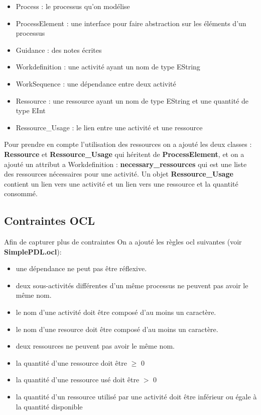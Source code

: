 \documentclass{article}
\begin{document}
\begin{itemize}
    \item Process : le processus qu'on modélise
    \item ProcessElement : une interface pour faire abstraction sur les éléments d'un processus
    \item Guidance : des notes écrites
    \item Workdefinition : une activité ayant un nom de type EString
    \item WorkSequence : une dépendance entre deux activité
    \item Ressource : une ressource ayant un nom de type EString et une quantité de type EInt
    \item Ressource\_Usage : le lien entre une activité et une ressource
\end{itemize}

Pour prendre en compte l'utilisation des ressources on a ajouté les deux classes : \textbf{Ressource} et \textbf{Ressource\_Usage}
qui héritent de \textbf{ProcessElement}, et on a ajouté un attribut a Workdefinition : \textbf{necessary\_ressources} qui est une liste 
des ressources nécessaires pour une activité. Un objet \textbf{Ressource\_Usage} contient un lien vers une activité et un lien vers 
une ressource et la quantité consommé.

\subsection{Contraintes OCL}
Afin de capturer plus de contraintes On a ajouté les règles ocl suivantes (voir \textbf{SimplePDL.ocl}):
\begin{itemize}
    \item une dépendance ne peut pas être réflexive.
    \item deux sous-activités différentes d’un même processus ne peuvent pas avoir le même nom.
    \item le nom d’une activité doit être composé d’au moins un caractère.
    \item le nom d’une resource doit être composé d’au moins un caractère.
    \item deux ressources ne peuvent pas avoir le même nom.
    \item la quantité d'une ressource doit être $\geq$ 0
    \item la quantité d'une ressource usé doit être $>$ 0
    \item la quantité d'un ressource utilisé par une activité doit être inférieur ou égale à la quantité disponible
\end{itemize}
\end{document}
